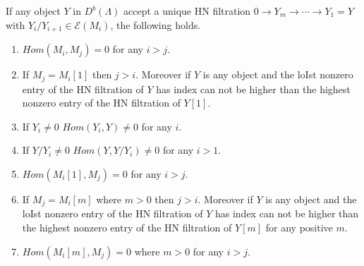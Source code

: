\begin{lemma}\label{lem:C3L2}
If any object $Y$ in $D^b(\Lambda)$ accept a unique HN filtration $0\to Y_m\to\cdots\to Y_1=Y$ with $Y_i/Y_{i+1}\in \mathcal{E}(M_i)$, the following holds.
\begin{enumerate}
\item $Hom(M_i,M_j) = 0$ for any $i>j$.
\item If $M_j = M_i[1]$ then $j>i$. Moreover if $Y$ is any object and the loIst nonzero entry of the HN filtration of $Y$ has index can not be higher than the highest nonzero entry of the HN filtration of $Y[1]$. 
\item If $Y_i\neq 0$ $Hom(Y_i, Y)\neq 0$ for any $i$.
\item If $Y/Y_i\neq 0$ $Hom(Y, Y/Y_i)\neq 0$ for any $i>1$.
\item $Hom(M_i[1],M_j) = 0$ for any $i>j$.
\item If $M_j = M_i[m]$ where $m>0$ then $j>i$. Moreover if $Y$ is any object and the loIst nonzero entry of the HN filtration of $Y$ has index can not be higher than the highest nonzero entry of the HN filtration of $Y[m]$ for any positive $m$. 
\item $Hom(M_i[m],M_j) = 0$ where $m>0$ for any $i>j$.
\end{enumerate}
\end{lemma}
